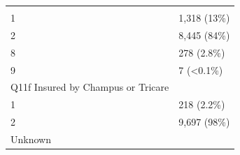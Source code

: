 \documentclass[]{article}
\begin{document}
\begin{longtable}[]{@{}ll@{}}
\begin{minipage}[t]{0.23\columnwidth}
\strut
\end{minipage}\tabularnewline
\begin{minipage}[t]{0.71\columnwidth}\raggedright
1\strut
\end{minipage} & \begin{minipage}[t]{0.23\columnwidth}\raggedright
1,318 (13\%)\strut
\end{minipage}\tabularnewline
\begin{minipage}[t]{0.71\columnwidth}\raggedright
2\strut
\end{minipage} & \begin{minipage}[t]{0.23\columnwidth}\raggedright
8,445 (84\%)\strut
\end{minipage}\tabularnewline
\begin{minipage}[t]{0.71\columnwidth}\raggedright
8\strut
\end{minipage} & \begin{minipage}[t]{0.23\columnwidth}\raggedright
278 (2.8\%)\strut
\end{minipage}\tabularnewline
\begin{minipage}[t]{0.71\columnwidth}\raggedright
9\strut
\end{minipage} & \begin{minipage}[t]{0.23\columnwidth}\raggedright
7 (\textless0.1\%)\strut
\end{minipage}\tabularnewline
\begin{minipage}[t]{0.71\columnwidth}\raggedright
Q11f Insured by Champus or Tricare\strut
\end{minipage} & \begin{minipage}[t]{0.23\columnwidth}\raggedright
\strut
\end{minipage}\tabularnewline
\begin{minipage}[t]{0.71\columnwidth}\raggedright
1\strut
\end{minipage} & \begin{minipage}[t]{0.23\columnwidth}\raggedright
218 (2.2\%)\strut
\end{minipage}\tabularnewline
\begin{minipage}[t]{0.71\columnwidth}\raggedright
2\strut
\end{minipage} & \begin{minipage}[t]{0.23\columnwidth}\raggedright
9,697 (98\%)\strut
\end{minipage}\tabularnewline
\begin{minipage}[t]{0.71\columnwidth}\raggedright
Unknown\strut
\end{minipage} & \begin{minipage}[t]{0.23\columnwidth}\raggedright

\end{minipage}
\end{longtable}
\end{document}
